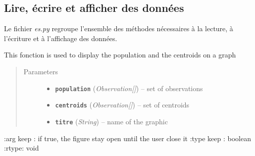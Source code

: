 \documentclass[letterpaper,10pt,english]{sphinxmanual}
\begin{document}
\subsection{Lire, écrire et afficher des données}
\label{data:lire-ecrire-et-afficher-des-donnees}
Le fichier \emph{es.py} regroupe l'ensemble des méthodes nécessaires à la lecture, à l'écriture et à l'affichage
des données.
\label{data:module-es}

\begin{fulllineitems}
\label{data:es.display}
This fonction is used to display the population and the centroids on a graph
\begin{quote}\begin{description}
\item[{Parameters}] \leavevmode\begin{itemize}
\item {} 
\textbf{\texttt{population}} (\emph{Observation{[}{]}}) -- set of observations

\item {} 
\textbf{\texttt{centroids}} (\emph{Observation{[}{]}}) -- set of centroids

\item {} 
\textbf{\texttt{titre}} (\emph{String}) -- name of the graphic

\end{itemize}

\end{description}\end{quote}

:arg    keep : if true, the figure stay open until the user close it
:type   keep : boolean
:rtype: void

\end{fulllineitems}

\end{document}

